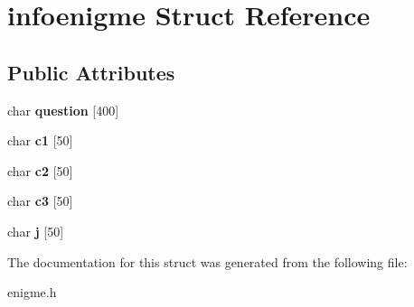 \hypertarget{structinfoenigme}{}\section{infoenigme Struct Reference}
\label{structinfoenigme}
\subsection*{Public Attributes}
\begin{DoxyCompactItemize}
\item 
\mbox{\label{structinfoenigme_ad6fdd3630e58b83201881ad679b5207d}} 
char {\bfseries question} \mbox{[}400\mbox{]}
\item 
\mbox{\label{structinfoenigme_aa03eb2791dd7dd5a0fc1eabca402fce0}} 
char {\bfseries c1} \mbox{[}50\mbox{]}
\item 
\mbox{\label{structinfoenigme_a1832b0f88aefdd8fd08c21d2452f2872}} 
char {\bfseries c2} \mbox{[}50\mbox{]}
\item 
\mbox{\label{structinfoenigme_a499e20a71627647ccef932d301424222}} 
char {\bfseries c3} \mbox{[}50\mbox{]}
\item 
\mbox{\label{structinfoenigme_aa29fbf975eba46cbe300e33085790958}} 
char {\bfseries j} \mbox{[}50\mbox{]}
\end{DoxyCompactItemize}


The documentation for this struct was generated from the following file\+:\begin{DoxyCompactItemize}
\item 
enigme.\+h\end{DoxyCompactItemize}
